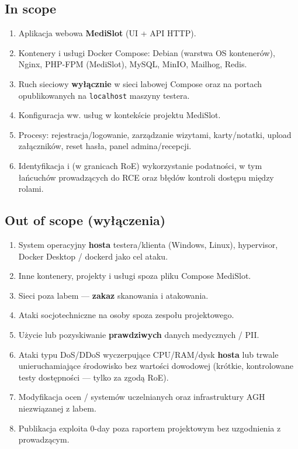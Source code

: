 \documentclass[11pt,a4paper]{article}
\begin{document}
\subsection{In scope}
\begin{enumerate}[leftmargin=*]
  \item Aplikacja webowa \textbf{MediSlot} (UI + API HTTP).
  \item Kontenery i usługi Docker Compose: Debian (warstwa OS kontenerów), Nginx, PHP-FPM (MediSlot), MySQL, MinIO, Mailhog, Redis.
  \item Ruch sieciowy \textbf{wyłącznie} w sieci labowej Compose oraz na portach opublikowanych na \texttt{localhost} maszyny testera.
  \item Konfiguracja ww. usług w kontekście projektu MediSlot.
  \item Procesy: rejestracja/logowanie, zarządzanie wizytami, karty/notatki, upload załączników, reset hasła, panel admina/recepcji.
  \item Identyfikacja i (w granicach RoE) wykorzystanie podatności, w tym łańcuchów prowadzących do RCE oraz błędów kontroli dostępu między rolami.
\end{enumerate}

\subsection{Out of scope (wyłączenia)}
\begin{enumerate}[leftmargin=*]
  \item System operacyjny \textbf{hosta} testera/klienta (Windows, Linux), hypervisor, Docker Desktop / dockerd jako cel ataku.
  \item Inne kontenery, projekty i usługi spoza pliku Compose MediSlot.
  \item Sieci poza labem — \textbf{zakaz} skanowania i atakowania.
  \item Ataki socjotechniczne na osoby spoza zespołu projektowego.
  \item Użycie lub pozyskiwanie \textbf{prawdziwych} danych medycznych / PII.
  \item Ataki typu DoS/DDoS wyczerpujące CPU/RAM/dysk \textbf{hosta} lub trwale unieruchamiające środowisko bez wartości dowodowej (krótkie, kontrolowane testy dostępności — tylko za zgodą RoE).
  \item Modyfikacja ocen / systemów uczelnianych oraz infrastruktury AGH niezwiązanej z labem.
  \item Publikacja exploita 0-day poza raportem projektowym bez uzgodnienia z prowadzącym.
\end{enumerate}
\end{document}
